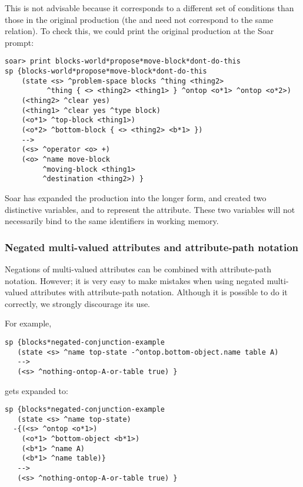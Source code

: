 This is not advisable because it corresponds to a different set of conditions than those in the original production (the  and  need not correspond to the same  relation). To check this, we could print the original production at the Soar prompt:

\begin{verbatim}
soar> print blocks-world*propose*move-block*dont-do-this
sp {blocks-world*propose*move-block*dont-do-this
    (state <s> ^problem-space blocks ^thing <thing2>
          ^thing { <> <thing2> <thing1> } ^ontop <o*1> ^ontop <o*2>)
    (<thing2> ^clear yes)
    (<thing1> ^clear yes ^type block)
    (<o*1> ^top-block <thing1>)
    (<o*2> ^bottom-block { <> <thing2> <b*1> })
    -->
    (<s> ^operator <o> +)
    (<o> ^name move-block
         ^moving-block <thing1>
         ^destination <thing2>) }
\end{verbatim}

Soar has expanded the production into the longer form, and created two distinctive variables,  and  to represent the  attribute. These two variables will not necessarily bind to the same identifiers in working memory.

\subsubsection*{Negated multi-valued attributes and attribute-path notation}

Negations of multi-valued attributes can be combined with attribute-path notation. However; it is very easy to make mistakes when using negated multi-valued attributes with attribute-path notation. Although it is possible to do it correctly, we strongly discourage its use.

For example,

\begin{verbatim}
sp {blocks*negated-conjunction-example
   (state <s> ^name top-state -^ontop.bottom-object.name table A)
   -->
   (<s> ^nothing-ontop-A-or-table true) }
\end{verbatim}

gets expanded to:

\begin{verbatim}
sp {blocks*negated-conjunction-example
   (state <s> ^name top-state)
  -{(<s> ^ontop <o*1>)
    (<o*1> ^bottom-object <b*1>)
    (<b*1> ^name A)
    (<b*1> ^name table)}
   -->
   (<s> ^nothing-ontop-A-or-table true) }
\end{verbatim}

